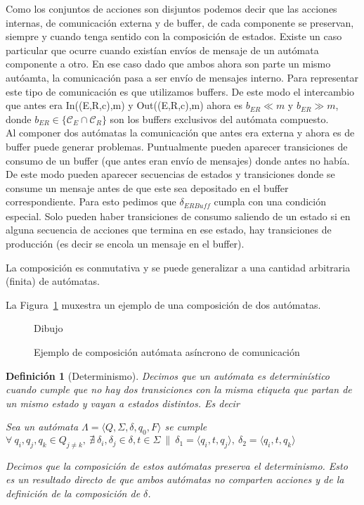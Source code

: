 \documentclass[paper=a4, fontsize=11pt, spanish]{scrartcl} %
\numberwithin{equation}{section} %
\numberwithin{figure}{section} %
\numberwithin{table}{section} %
\newtheorem{definition}{Definición}
\begin{document}
Como los conjuntos de acciones son disjuntos podemos decir que las acciones internas, de comunicación externa y de buffer, de cada componente se preservan, siempre y cuando tenga sentido con la composición de estados. Existe un caso particular que ocurre cuando existían envíos de mensaje de un autómata componente a otro. En ese caso dado que ambos ahora son parte un mismo autóamta, la comunicación pasa a ser envío de mensajes interno. Para representar este tipo de comunicación es que utilizamos buffers. De este modo el intercambio que antes era In((E,R,c),m) y Out((E,R,c),m) ahora es $b_{ER}  \ll m$ y $b_{ER}  \gg  m$, donde $ b_{ER} \in \{ \mathcal{C}_E \cap \mathcal{C}_R \} $ son los buffers exclusivos del autómata compuesto. \\

Al componer dos autómatas la comunicación que antes era externa y ahora es de buffer puede generar problemas. Puntualmente pueden aparecer transiciones de consumo de un buffer (que antes eran envío de mensajes) donde antes no había. De este modo pueden aparecer secuencias de estados y transiciones donde se consume un mensaje antes de que este sea depositado en el buffer correspondiente. Para esto pedimos que $\delta_\mathit{ERBuff}$ cumpla con una condición especial. Solo pueden haber transiciones de consumo saliendo de un estado si en alguna secuencia de acciones que termina en ese estado, hay transiciones de producción (es decir se encola un mensaje en el buffer).

La composición es conmutativa y se puede generalizar a una cantidad arbitraria (finita) de autómatas.



La Figura~\ref{fig:ejemplo-aa} muxestra un ejemplo de una composición de dos autómatas. 

\begin{figure}[ht]
\begin{center}
Dibujo
\end{center}
\caption{Ejemplo de composición autómata asíncrono de comunicación}
\label{fig:ejemplo-aa}
\end{figure} 

\begin{definition}[Determinismo] Decimos que un autómata es determinístico cuando cumple que no hay dos transiciones con la misma etiqueta que partan de un mismo estado y vayan a estados distintos. Es decir 

\begin{centering}
Sea un autómata $ \Lambda = \langle Q, \Sigma, \delta, q_0, F \rangle$ se cumple
$ \forall \  q_i, q_j, q_k \in Q_{j \neq k}, \  \nexists \ \delta_i, \delta_j \in \delta, t \in \Sigma \ \| \  \delta_1 = \langle q_i, t, q_j \rangle, \ \delta_2 = \langle q_i, t, q_k \rangle$ \\
\end{centering} 

Decimos que la composición de estos autómatas preserva el determinismo. Esto es un resultado directo de que ambos autómatas no comparten acciones y de la definición de la composición de $\delta$.

\end{definition}
\end{document}
